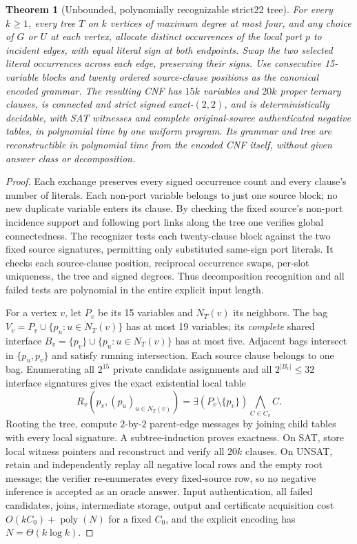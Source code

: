 \documentclass[11pt]{article}
\newtheorem{theorem}{Theorem}
\begin{document}
\begin{theorem}[Unbounded, polynomially recognizable strict22 tree]
For every $k\ge1$, every tree $T$ on $k$ vertices of maximum degree at most four, and any choice of $G$ or $U$ at each vertex, allocate distinct occurrences of the local port $p$ to incident edges, with equal literal sign at both endpoints. Swap the two selected literal occurrences across each edge, preserving their signs. Use consecutive 15-variable blocks and twenty ordered source-clause positions as the \emph{canonical encoded grammar}. The resulting CNF has $15k$ variables and $20k$ proper ternary clauses, is connected and strict signed exact-$(2,2)$, and is deterministically decidable, with SAT witnesses and complete original-source authenticated negative tables, in polynomial time by \emph{one} uniform program. Its grammar and tree are reconstructible in polynomial time from the encoded CNF itself, without given answer class or decomposition.
\end{theorem}
\begin{proof}
Each exchange preserves every signed occurrence count and every clause's number of literals. Each non-port variable belongs to just one source block; no new duplicate variable enters its clause. By checking the fixed source's non-port incidence support and following port links along the tree one verifies global connectedness. The recognizer tests each twenty-clause block against the two fixed source signatures, permitting only substituted same-sign port literals. It checks each source-clause position, reciprocal occurrence swaps, per-slot uniqueness, the tree and signed degrees. Thus decomposition recognition and all failed tests are polynomial in the entire explicit input length.

For a vertex $v$, let $P_v$ be its 15 variables and $N_T(v)$ its neighbors. The bag $V_v=P_v\cup\{p_u:u\in N_T(v)\}$ has at most 19 variables; its \emph{complete} shared interface $B_v=\{p_v\}\cup\{p_u:u\in N_T(v)\}$ has at most five. Adjacent bags intersect in $\{p_u,p_v\}$ and satisfy running intersection. Each source clause belongs to one bag. Enumerating all $2^{15}$ private candidate assignments and all $2^{|B_v|}\le32$ interface signatures gives the exact existential local table
\[
 R_v(p_v,(p_u)_{u\in N_T(v)})=
 \exists(P_v\setminus\{p_v\})\bigwedge_{C\in C_v} C.
\]
Rooting the tree, compute $2$-by-$2$ parent-edge messages by joining child tables with every local signature. A subtree-induction proves exactness. On SAT, store local witness pointers and reconstruct and verify all $20k$ clauses. On UNSAT, retain and independently replay all negative local rows and the empty root message; the verifier re-enumerates every fixed-source row, so no negative inference is accepted as an oracle answer. Input authentication, all failed candidates, joins, intermediate storage, output and certificate acquisition cost $O(kC_0)+\operatorname{poly}(N)$ for a fixed $C_0$, and the explicit encoding has $N=\Theta(k\log k)$.
\end{proof}
\end{document}
